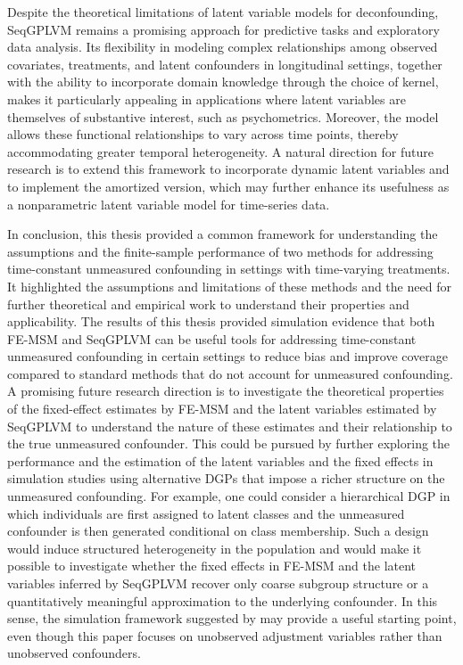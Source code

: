 Despite the theoretical limitations of latent variable 
models for deconfounding, SeqGPLVM remains a promising approach for 
predictive tasks and exploratory data analysis. Its flexibility in 
modeling complex relationships among observed covariates, treatments, 
and latent confounders in longitudinal settings, together with the ability 
to incorporate domain knowledge through the choice of kernel, makes it 
particularly appealing in applications where latent variables are themselves of 
substantive interest, such as psychometrics. Moreover, the model allows these 
functional relationships to vary across time points, thereby accommodating greater 
temporal heterogeneity. A natural direction for future research is to extend this 
framework to incorporate dynamic latent variables and to implement 
the amortized version, which may further enhance its 
usefulness as a nonparametric latent variable model for time-series data.

In conclusion, this thesis provided a common framework for understanding the assumptions 
and the finite-sample performance of two methods for addressing time-constant unmeasured 
confounding in settings with time-varying treatments. 
It highlighted the assumptions and limitations of these methods and 
the need for further theoretical and empirical work to understand their 
properties and applicability. The 
results of this thesis provided simulation evidence that both FE-MSM 
and SeqGPLVM can be useful tools for addressing time-constant unmeasured confounding in 
certain settings to reduce bias and improve coverage compared to standard methods 
that do not account for unmeasured confounding. A promising future research 
direction is to 
investigate the theoretical properties of the fixed-effect estimates by FE-MSM and the 
latent variables estimated by SeqGPLVM to understand the nature of these estimates 
and their relationship to the true unmeasured confounder. This could be pursued by 
further exploring the performance and the estimation of the latent variables 
and the fixed effects 
in simulation studies using alternative DGPs 
that impose a richer structure on the unmeasured confounding. 
For example, one could consider 
a hierarchical DGP in which individuals are first assigned to latent 
classes and the unmeasured confounder 
is then generated conditional on class membership. Such a design would 
induce structured heterogeneity in 
the population and would make it possible to investigate whether the fixed effects 
in FE-MSM and the latent 
variables inferred by SeqGPLVM recover only coarse subgroup structure or a 
quantitatively meaningful 
approximation to the underlying confounder. 
In this sense, the simulation framework suggested by 
 may provide a useful starting point, 
even though this paper focuses on unobserved adjustment 
variables rather than unobserved confounders.

